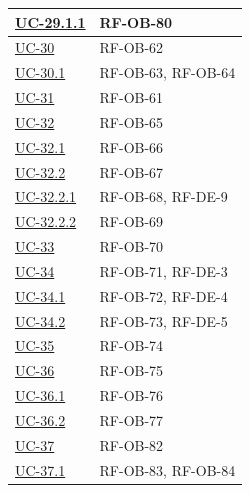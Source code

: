 \documentclass[a4paper,12pt]{article}
\begin{document}
\begin{center}
\begin{longtable}{|>{\centering\arraybackslash}p{5cm}|>{\centering\arraybackslash}p{9cm}|}
\hyperref[subsec:UC-29.1.1]{UC-29.1.1} & RF-OB-80 \\
\hline

\hyperref[subsec:UC-30]{UC-30} & RF-OB-62 \\
\hline

\hyperref[subsec:UC-30.1]{UC-30.1} & RF-OB-63, RF-OB-64 \\
\hline

\hyperref[subsec:UC-31]{UC-31} & RF-OB-61 \\
\hline

\hyperref[subsec:UC-32]{UC-32} & RF-OB-65 \\
\hline

\hyperref[subsec:UC-32.1]{UC-32.1} & RF-OB-66 \\
\hline

\hyperref[subsec:UC-32.2]{UC-32.2} & RF-OB-67 \\
\hline

\hyperref[subsec:UC-32.2.1]{UC-32.2.1} & RF-OB-68, RF-DE-9 \\
\hline

\hyperref[subsec:UC-32.2.2]{UC-32.2.2} & RF-OB-69 \\
\hline

\hyperref[subsec:UC-33]{UC-33} & RF-OB-70 \\
\hline

\hyperref[subsec:UC-34]{UC-34} & RF-OB-71, RF-DE-3 \\
\hline

\hyperref[subsec:UC-34.1]{UC-34.1} & RF-OB-72, RF-DE-4 \\
\hline

\hyperref[subsec:UC-34.2]{UC-34.2} & RF-OB-73, RF-DE-5 \\
\hline

\hyperref[subsec:UC-35]{UC-35} & RF-OB-74 \\
\hline

\hyperref[subsec:UC-36]{UC-36} & RF-OB-75 \\
\hline

\hyperref[subsec:UC-36.1]{UC-36.1} & RF-OB-76 \\
\hline

\hyperref[subsec:UC-36.2]{UC-36.2} & RF-OB-77 \\
\hline

\hyperref[subsec:UC-37]{UC-37} & RF-OB-82 \\
\hline

\hyperref[subsec:UC-37.1]{UC-37.1} & RF-OB-83, RF-OB-84 \\
\hline


\end{longtable}
\end{center}
\end{document}
